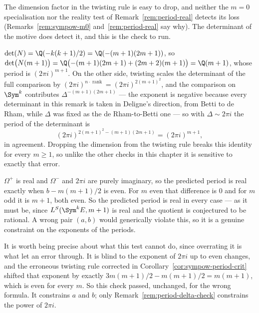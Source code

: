 \begin{remark}
  \label{rem:period-delta-check}
  The dimension factor in the twisting rule is easy to drop, and neither the $m=0$
  specialisation nor the reality test of Remark~\ref{rem:period-real} detects its loss
  (Remarks~\ref{rem:sympow-m0} and~\ref{rem:period-real} say why). The determinant of the
  motive does detect it, and this is the check to run.

  $\det(N) = \Q(-k(k+1)/2) = \Q(-(m+1)(2m+1))$, so
  $\det\bigl(N(m+1)\bigr) = \Q\bigl(-(m+1)(2m+1) + (2m+2)(m+1)\bigr) = \Q(m+1)$, whose period
  is $(2\pi i)^{m+1}$. On the other side, twisting scales the determinant of the full
  comparison by $(2\pi i)^{n \cdot \operatorname{rank}} = (2\pi i)^{2(m+1)^{2}}$, and the
  comparison on $\Sym^{k}$ contributes $\Delta^{-(m+1)(2m+1)}$ --- the exponent is negative
  because every determinant in this remark is taken in Deligne's direction, from Betti to de
  Rham, while $\Delta$ was fixed as the de Rham-to-Betti one --- so with
  $\Delta \sim 2\pi i$ the period of the determinant is
  \[ (2\pi i)^{2(m+1)^{2} - (m+1)(2m+1)} = (2\pi i)^{m+1}, \]
  in agreement. Dropping the dimension from the twisting rule breaks this identity for every
  $m \geq 1$, so unlike the other checks in this chapter it is sensitive to exactly that
  error.
\end{remark}

\begin{remark}
  \label{rem:period-real}
  $\Omega^{+}$ is real and $\Omega^{-}$ and $2\pi i$ are purely imaginary, so the predicted
  period is real exactly when $b - m(m+1)/2$ is even. For $m$ even that difference is $0$ and
  for $m$ odd it is $m+1$, both even. So the predicted period is real in every case --- as it
  must be, since $L^{S}(\Sym^{k}E,m+1)$ is real and the quotient is conjectured to be
  rational. A wrong pair $(a,b)$ would generically violate this, so it is a genuine constraint
  on the exponents of the periods.

  It is worth being precise about what this test cannot do, since overrating it is what let
  an error through. It is blind to the exponent of $2\pi i$ up to even changes, and the
  erroneous twisting rule corrected in Corollary~\ref{cor:sympow-period-crit} shifted that
  exponent by exactly $3m(m+1)/2 - m(m+1)/2 = m(m+1)$, which is even for every $m$. So this
  check passed, unchanged, for the wrong formula. It constrains $a$ and $b$; only
  Remark~\ref{rem:period-delta-check} constrains the power of $2\pi i$.
\end{remark}

